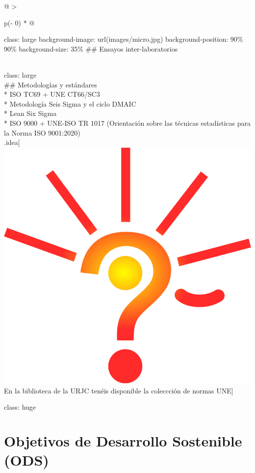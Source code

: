 \documentclass[
]{book}
\begin{document}
\begin{longtable}[]{@{}
  >{\raggedright\arraybackslash}p{(\columnwidth - 0\tabcolsep) * }@{}}
\toprule
\begin{minipage}[b]{\linewidth}\raggedright
class: large
background-image: url(images/micro.jpg)
background-position: 90\% 90\%
background-size: 35\%
\#\# Ensayos inter-laboratorios
\end{minipage} \\
\midrule
\endhead
class: large \\
\#\# Metodologías y estándares \\
* ISO TC69 + UNE CT66/SC3 \\
* Metodología Seis Sigma y el ciclo DMAIC \\
* Lean Six Sigma \\
* ISO 9000 + UNE-ISO TR 1017 (Orientación sobre las técnicas estadísticas para la Norma ISO 9001:2020) \\
.idea{[}\includegraphics{images/idea.png} En la biblioteca de la URJC tenéis disponible la coleccción de normas UNE{]} \\
\bottomrule
\end{longtable}

class: huge

\hypertarget{objetivos-de-desarrollo-sostenible-ods}{%
\section{Objetivos de Desarrollo Sostenible (ODS)}\label{objetivos-de-desarrollo-sostenible-ods}}
\end{document}
